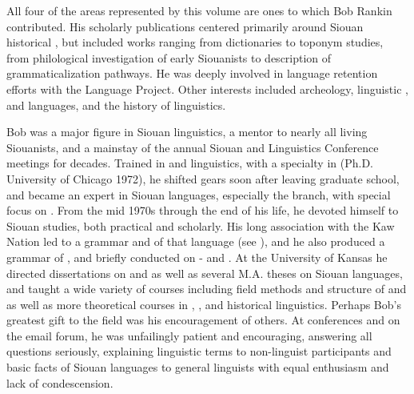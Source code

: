\begin{refsection}
All four of the areas represented by this volume are ones to which Bob Rankin contributed. His scholarly publications centered primarily around Siouan historical , but included works ranging from dictionaries to toponym studies, from philological investigation of early Siouanists  to description of grammaticalization pathways. He was deeply involved in language retention efforts with the  Language Project. Other interests included archeology, linguistic ,  and  languages, and the history of linguistics. 

Bob was a major figure in Siouan linguistics, a mentor to nearly all living Siouanists, and a mainstay of the annual Siouan and  Linguistics Conference meetings for decades. Trained in  and  linguistics, with a specialty in  (Ph.D. University of Chicago 1972), he shifted gears soon after leaving graduate school, and became an expert in Siouan languages, especially the  branch, with special focus on . From the mid 1970s through the end of his life, he devoted himself to Siouan studies, both practical and scholarly. His long association with the Kaw Nation led to a grammar and  of that language (see \citealt{Cumberland2016}), and he also produced a grammar of , and briefly conducted  on - and . At the University of Kansas he directed dissertations on  \citep{Trechter1995} and  \citep{Oliverio1996} as well as several M.A. theses on Siouan languages, and taught a wide variety of courses including field methods and structure of  and  as well as more theoretical courses in , , and historical linguistics. Perhaps Bob's greatest gift to the field was his encouragement of others. At conferences and on the  email forum, he was unfailingly patient and encouraging, answering all questions seriously, explaining linguistic terms to non-linguist participants and basic facts of Siouan languages to general linguists with equal enthusiasm and lack of condescension.


\end{refsection}
